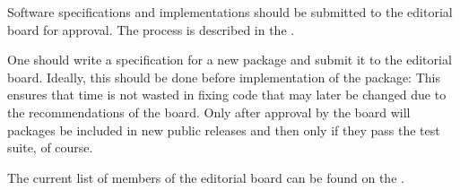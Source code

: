 Software specifications and implementations should be submitted to the
editorial board for approval. The process is described in the 
. 


One should write a specification for a new package
and submit it to the editorial board.
Ideally, this should be done before implementation of the package: This
ensures that time is not wasted in fixing code that may later be changed
due to the recommendations of the board.
Only after approval by the board will packages be included in new
public releases and then only if they pass the test suite, of course.

The current list of members of the editorial board can be found on the 
.

